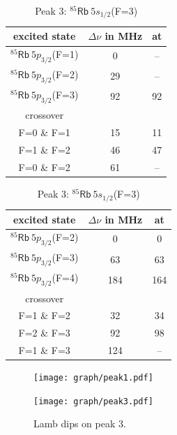 \begin{table}[h]
   \begin{subtable}{0.48\textwidth}
	\centering
	\caption{Peak 2: $^{85}\mathsf{Rb}~5s_{1/2}$(F=2)}
	\begin{tabular}{ccc}
		\toprule
		 excited state 					& $\Delta \nu$ in MHz	& at \\
		\midrule
		$^{85}\mathsf{Rb}~5p_{3/2}$(F=1)	& 0					&  --	\\
		$^{85}\mathsf{Rb}~5p_{3/2}$(F=2)	& 29					&  --	\\
		$^{85}\mathsf{Rb}~5p_{3/2}$(F=3)	& 92					& 92	\\[1ex]
		crossover		\\[-0.5ex]
		\midrule
		F=0 \& F=1					& 15					& 11	\\
		F=1 \& F=2					& 46					& 47	\\
		F=0 \& F=2					& 61					&  --	\\
		\bottomrule
	\end{tabular}
   \end{subtable}
   \hfill
   \begin{subtable}{0.48\textwidth}
	\centering
	\caption{Peak 3: $^{85}\mathsf{Rb}~5s_{1/2}$(F=3)}
	\begin{tabular}{ccc}
		\toprule
		 excited state 					& $\Delta \nu$ in MHz	& at \\
		\midrule
		$^{85}\mathsf{Rb}~5p_{3/2}$(F=2)	& 0					& 0		\\
		$^{85}\mathsf{Rb}~5p_{3/2}$(F=3)	& 63					& 63		\\
		$^{85}\mathsf{Rb}~5p_{3/2}$(F=4)	& 184				& 164	\\[1ex]
		crossover		\\[-0.5ex]
		\midrule
		F=1 \& F=2					& 32					& 34		\\
		F=2 \& F=3					& 92					& 98		\\
		F=1 \& F=3					& 124				& --		\\
		\bottomrule
	\end{tabular}
   \end{subtable}
\end{table}


\begin{figure}[p]
	\centering
	\texttt{[image: graph/peak1.pdf]}
	\vspace{-1ex}
	\caption{Lamb dips on peak 1.}
	\label{fig:P1}
	\vspace{2ex}

	\texttt{[image: graph/peak3.pdf]}
	\vspace{-1ex}
	\caption{Lamb dips on peak 3.}
	\label{fig:P3}
	\vspace{-2em}
\end{figure}

